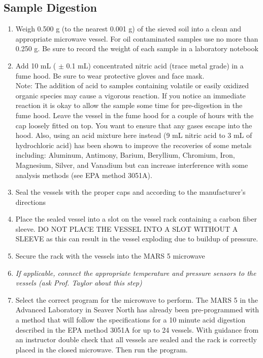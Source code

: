 \documentclass[12pt]{../SOP3_alpha}\usepackage[]{graphicx}\usepackage[]{color}
\begin{document}
\subsection{Sample Digestion}
  \begin{enumerate}
  \item	Weigh 0.500 g (to the nearest 0.001 g) of the sieved soil into a clean and appropriate microwave vessel. For oil contaminated samples use no more than 0.250 g. Be sure to record the weight of each sample in a laboratory notebook
  \item	Add 10 mL ( $\pm$ 0.1 mL) concentrated nitric acid (trace metal grade) in a fume hood. Be sure to wear protective gloves and face mask. \\ Note: The addition of acid to samples containing volatile or easily oxidized organic species may cause a vigorous reaction. If you notice an immediate reaction it is okay to allow the sample some time for pre-digestion in the fume hood. Leave the vessel in the fume hood for a couple of hours with the cap loosely fitted on top. You want to ensure that any gases escape into the hood. Also, using an acid mixture here instead (9 mL nitric acid to 3 mL of hydrochloric acid) has been shown to improve the recoveries of some metals including: Aluminum, Antimony, Barium, Beryllium, Chromium, Iron, Magnesium, Silver, and Vanadium but can increase interference with some analysis methods (see EPA method 3051A). 
  \item Seal the vessels with the proper caps and according to the manufacturer’s directions
  \item Place the sealed vessel into a slot on the vessel rack containing a carbon fiber sleeve. DO NOT PLACE THE VESSEL INTO A SLOT WITHOUT A SLEEVE as this can result in the vessel exploding due to buildup of pressure. 
  \item Secure the rack with the vessels into the MARS 5 microwave
  \item \emph{If applicable, connect the appropriate temperature and pressure sensors to the vessels (ask Prof. Taylor about this step)}
  \item Select the correct program for the microwave to perform. The MARS 5 in the Advanced Laboratory in Seaver North has already been pre-programmed with a method that will follow the specifications for a 10 minute acid digestion described in the EPA method 3051A for up to 24 vessels. With guidance from an instructor double check that all vessels are sealed and the rack is correctly placed in the closed microwave. Then run the program. \vspace{4mm} \\
  

\end{enumerate}
\end{document}
